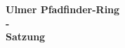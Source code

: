 \begin{titlepage}
    \begin{center}
        \begin{Huge}
            \textbf{
                Ulmer Pfadfinder-Ring\\
                -\\
                Satzung
            }
        \end{Huge}
    \end{center}
\end{titlepage}
